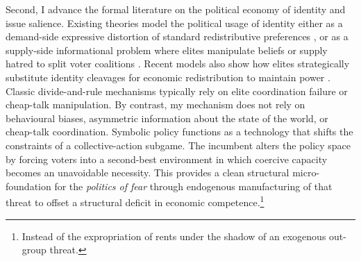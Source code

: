 \documentclass[11pt,twoside]{extarticle}
\begin{document}

Second, I advance the formal literature on the political economy of identity and issue salience. Existing theories model the political usage of identity either as a demand-side expressive distortion of standard redistributive preferences \citep{shayoModelSocialIdentity2009, besleyRiseIdentityPolitics2019, gennaioliIdentityPolitics2023}, or as a supply-side informational problem where elites manipulate beliefs or supply hatred to split voter coalitions \citep*{glaeserPoliticalEconomyHatred2005, baligaStrategyManipulatingConflict2012, izzoIdeologicalCompetition2023, callanderCauseEffectPolitical2022}. Recent models also show how elites strategically substitute identity cleavages for economic redistribution to maintain power \citep*{acemogluKleptocracyDivideandRuleModel2004,padróimiquelControlPoliticiansDivided2007,mukandPoliticalEconomyLiberal2020}. Classic divide-and-rule mechanisms typically rely on elite coordination failure or cheap-talk manipulation. By contrast, my mechanism does not rely on behavioural biases, asymmetric information about the state of the world, or cheap-talk coordination. Symbolic policy functions as a technology that shifts the constraints of a collective-action subgame. The incumbent alters the policy space by forcing voters into a second-best environment in which coercive capacity becomes an unavoidable necessity. This provides a clean structural micro-foundation for the \emph{politics of fear} through endogenous manufacturing of that threat to offset a structural deficit in economic competence.\footnote{Instead of the expropriation of rents under the shadow of an exogenous out-group threat.}

\end{document}
